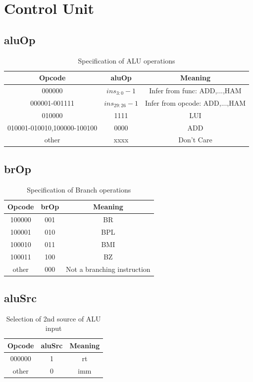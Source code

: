 \documentclass{article}
\begin{document}
\section{Control Unit}

\subsection{aluOp}
\begin{table}[H]
    \centering
    \begin{tabular}{|c|c|c|}
        \hline
        \textbf{Opcode} & \textbf{aluOp} & \textbf{Meaning} \\
        \hline
        000000 & $ins_{3:0}-1$ & Infer from func: ADD,...,HAM \\
        000001-001111 & $ins_{29:26}-1$ & Infer from opcode: ADD,...,HAM \\
        010000 & 1111 & LUI \\
        010001-010010,100000-100100 & 0000 & ADD \\
        other & xxxx & Don't Care \\
        \hline
    \end{tabular}
    \caption{Specification of ALU operations}
\end{table}

\subsection{brOp}
\begin{table}[H]
    \centering
    \begin{tabular}{|c|c|c|}
        \hline
        \textbf{Opcode} & \textbf{brOp} & \textbf{Meaning} \\
        \hline
        100000 & 001 & BR \\
        100001 & 010 & BPL \\
        100010 & 011 & BMI \\
        100011 & 100 & BZ \\
        other & 000 & Not a branching instruction \\
        \hline
    \end{tabular}
    \caption{Specification of Branch operations}
\end{table}

\subsection{aluSrc}
\begin{table}[H]
    \centering
    \begin{tabular}{|c|c|c|}
        \hline
        \textbf{Opcode} & \textbf{aluSrc} & \textbf{Meaning} \\
        \hline
        000000 & 1 & rt \\
        other & 0 & imm \\
        \hline
    \end{tabular}
    \caption{Selection of 2nd source of ALU input}
\end{table}
\end{document}
